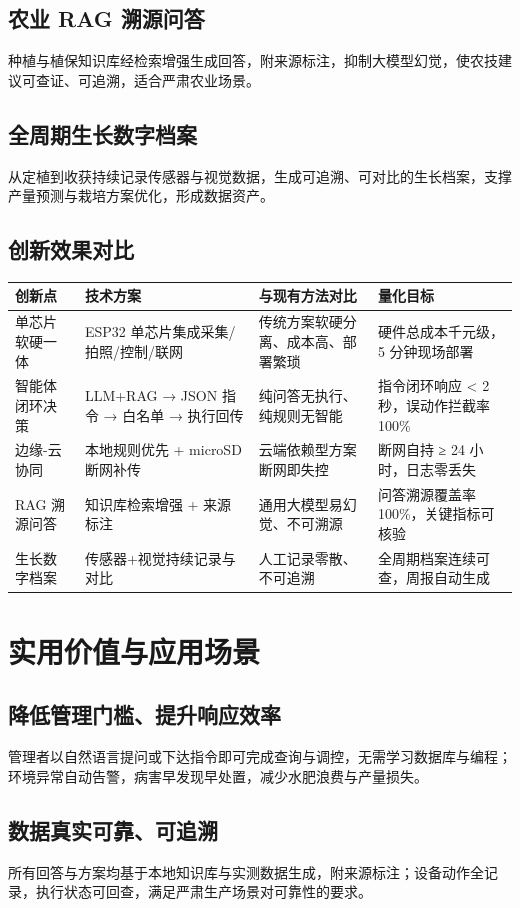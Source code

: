 ﻿\documentclass[11pt]{ctexart}
\begin{document}
\subsection{农业 RAG 溯源问答}
种植与植保知识库经检索增强生成回答，附来源标注，抑制大模型幻觉，使农技建议可查证、可追溯，适合严肃农业场景。

\subsection{全周期生长数字档案}
从定植到收获持续记录传感器与视觉数据，生成可追溯、可对比的生长档案，支撑产量预测与栽培方案优化，形成数据资产。

\subsection{创新效果对比}
\begin{longtable}{p{2.3cm}p{4.4cm}p{4.2cm}p{3.6cm}}
  \toprule
  创新点 & 技术方案 & 与现有方法对比 & 量化目标 \\
  \midrule
  单芯片软硬一体 & ESP32 单芯片集成采集/拍照/控制/联网 & 传统方案软硬分离、成本高、部署繁琐 & 硬件总成本千元级，5 分钟现场部署 \\
  智能体闭环决策 & LLM+RAG → JSON 指令 → 白名单 → 执行回传 & 纯问答无执行、纯规则无智能 & 指令闭环响应 < 2 秒，误动作拦截率 100\% \\
  边缘-云协同 & 本地规则优先 + microSD 断网补传 & 云端依赖型方案断网即失控 & 断网自持 ≥ 24 小时，日志零丢失 \\
  RAG 溯源问答 & 知识库检索增强 + 来源标注 & 通用大模型易幻觉、不可溯源 & 问答溯源覆盖率 100\%，关键指标可核验 \\
  生长数字档案 & 传感器+视觉持续记录与对比 & 人工记录零散、不可追溯 & 全周期档案连续可查，周报自动生成 \\
  \bottomrule
\end{longtable}

\section{实用价值与应用场景}
\subsection{降低管理门槛、提升响应效率}
管理者以自然语言提问或下达指令即可完成查询与调控，无需学习数据库与编程；环境异常自动告警，病害早发现早处置，减少水肥浪费与产量损失。

\subsection{数据真实可靠、可追溯}
所有回答与方案均基于本地知识库与实测数据生成，附来源标注；设备动作全记录，执行状态可回查，满足严肃生产场景对可靠性的要求。
\end{document}
